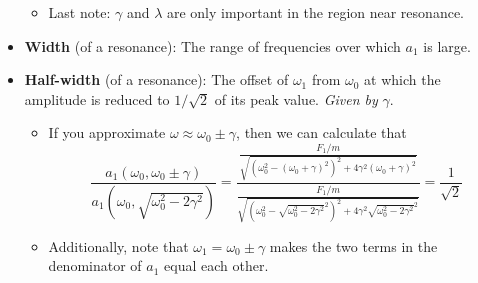 \documentclass[../notes.tex]{subfiles}
\begin{document}
\begin{itemize}
\begin{itemize}
        \item Last note: $\gamma$ and $\lambda$ are only important in the region near resonance.
    \end{itemize}
    \item \textbf{Width} (of a resonance): The range of frequencies over which $a_1$ is large.
    \item \textbf{Half-width} (of a resonance): The offset of $\omega_1$ from $\omega_0$ at which the amplitude is reduced to $1/\sqrt{2}$ of its peak value. \emph{Given by} $\gamma$.
    \begin{itemize}
        \item If you approximate $\omega\approx\omega_0\pm\gamma$, then we can calculate that
        \begin{equation*}
            \frac{a_1(\omega_0,\omega_0\pm\gamma)}{a_1(\omega_0,\sqrt{\omega_0^2-2\gamma^2})} = \frac{\frac{F_1/m}{\sqrt{(\omega_0^2-(\omega_0+\gamma)^2)^2+4\gamma^2(\omega_0+\gamma)^2}}}{\frac{F_1/m}{\sqrt{\left( \omega_0^2-\sqrt{\omega_0^2-2\gamma^2}^2 \right)^2+4\gamma^2\sqrt{\omega_0^2-2\gamma^2}^2}}}
            = \frac{1}{\sqrt{2}}
        \end{equation*}
        \item Additionally, note that $\omega_1=\omega_0\pm\gamma$ makes the two terms in the denominator of $a_1$ equal each other.
    \end{itemize}
\end{itemize}
\end{document}
